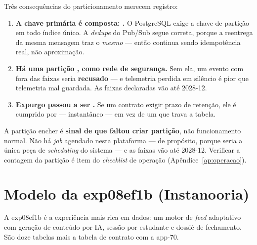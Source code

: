 Três consequências do particionamento merecem registro:

\begin{enumerate}
  \item \textbf{A chave primária é composta: .} O PostgreSQL
    exige a chave de partição em todo índice único. A \emph{dedupe} do Pub/Sub
    segue correta, porque a reentrega da mesma mensagem traz o \emph{mesmo}
     --- então  continua sendo
    idempotência real, não aproximação.
  \item \textbf{Há uma partição , como rede de segurança.} Sem ela,
    um evento com  fora das faixas seria \textbf{recusado} --- e
    telemetria perdida em silêncio é pior que telemetria mal guardada. As faixas
    declaradas vão até 2028-12.
  \item \textbf{Expurgo passou a ser .} Se um contrato exigir
    prazo de retenção, ele é cumprido por  ---
    instantâneo --- em vez de um  que trava a tabela.
\end{enumerate}

\begin{atencao}
A partição  encher é \textbf{sinal de que faltou criar partição}, não
funcionamento normal. Não há \emph{job} agendado nesta plataforma --- de
propósito, porque seria a única peça de \emph{scheduling} do sistema --- e as
faixas vão até 2028-12. Verificar a contagem da partição  é item do
\emph{checklist} de operação (Apêndice~\ref{ap:operacao}).
\end{atencao}

\section{Modelo da exp08ef1b (Instanooria)}

A exp08ef1b é a experiência mais rica em dados: um motor de \emph{feed} adaptativo
com geração de conteúdo por IA, sessão por estudante e dossiê de fechamento. São doze
tabelas  mais a tabela de contrato com a app-70.

